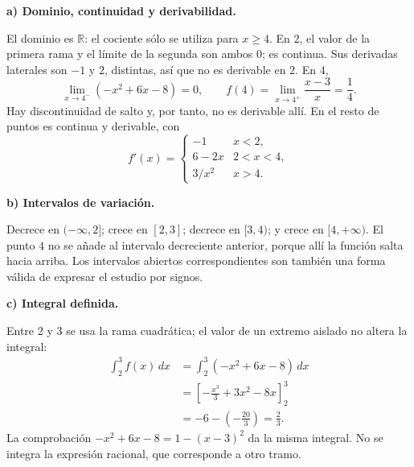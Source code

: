 \textbf{a) Dominio, continuidad y derivabilidad.}\par\nopagebreak[4]
El dominio es $\mathbb R$: el cociente sólo se utiliza para $x\geq4$. En $2$, el valor de la primera rama y el límite de la segunda son ambos $0$; es continua. Sus derivadas laterales son $-1$ y $2$, distintas, así que no es derivable en $2$.
En $4$,
\[
\lim_{x\to4^-}(-x^2+6x-8)=0,\qquad
f(4)=\lim_{x\to4^+}\frac{x-3}{x}=\frac14.
\]
Hay discontinuidad de salto y, por tanto, no es derivable allí. En el resto de puntos es continua y derivable, con
\[
f'(x)=\begin{cases}-1&x<2,\\6-2x&2<x<4,\\3/x^2&x>4.\end{cases}
\]

\textbf{b) Intervalos de variación.}\par\nopagebreak[4]
Decrece en $(-\infty,2]$; crece en $[2,3]$; decrece en $[3,4)$; y crece en $[4,+\infty)$. El punto $4$ no se añade al intervalo decreciente anterior, porque allí la función salta hacia arriba. Los intervalos abiertos correspondientes son también una forma válida de expresar el estudio por signos.

\textbf{c) Integral definida.}\par\nopagebreak[4]
Entre $2$ y $3$ se usa la rama cuadrática; el valor de un extremo aislado no altera la integral:
\[
\begin{aligned}
\int_2^3f(x)\,dx&=\int_2^3(-x^2+6x-8)\,dx\\
&=\left[-\frac{x^3}{3}+3x^2-8x\right]_2^3\\
&=-6-\left(-\frac{20}{3}\right)=\boxed{\frac23.}
\end{aligned}
\]
La comprobación $-x^2+6x-8=1-(x-3)^2$ da la misma integral. No se integra la expresión racional, que corresponde a otro tramo.
